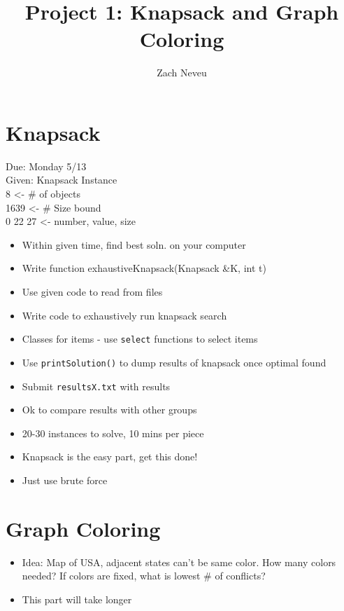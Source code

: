 \documentclass[12pt, letter]{article}
\author{Zach Neveu}
\title{ Project 1: Knapsack and Graph Coloring }
\begin{document}
\maketitle

\section{Knapsack}%
\label{sec:knapsack}

Due: Monday 5/13 \\

Given: Knapsack Instance \\
8	<- \# of objects \\
1639	<- \# Size bound \\
0 22 27 <- number, value, size \\

\begin{itemize}
	\item Within given time, find best soln. on your computer
	\item Write function exhaustiveKnapsack(Knapsack \&K, int t)
	\item Use given code to read from files
	\item Write code to exhaustively run knapsack search
	\item Classes for items - use \verb|select| functions to select items
	\item Use \verb|printSolution()| to dump results of knapsack once optimal found
	\item Submit \verb|resultsX.txt| with results
	\item Ok to compare results with other groups
	\item 20-30 instances to solve, 10 mins per piece
	\item Knapsack is the easy part, get this done!
	\item Just use brute force
\end{itemize}

\section{Graph Coloring}%
\label{sec:graph_coloring}
\begin{itemize}
	\item Idea: Map of USA, adjacent states can't be same color. How many colors needed? If colors are fixed, what is lowest \# of conflicts?
	\item This part will take longer
\end{itemize}
\end{document}
